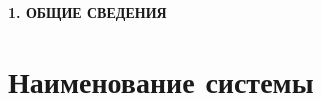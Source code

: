 \onehalfspacing
\setcounter{page}{2}

\newpage
\renewcommand{\contentsname}{\centerline{\large СОДЕРЖАНИЕ}}
\tableofcontents

\newpage
\begin{center}
  \textbf{\large 1. ОБЩИЕ СВЕДЕНИЯ}
\end{center}

\section{Наименование системы}

